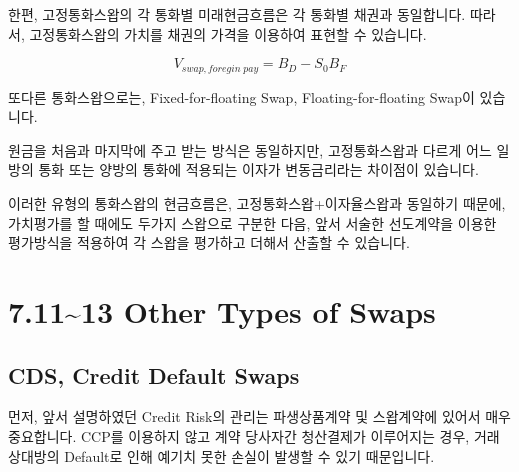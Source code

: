 \documentclass[
  letterpaper,
  DIV=11,
  numbers=noendperiod]{scrreprt}
\begin{document}
한편, 고정통화스왑의 각 통화별 미래현금흐름은 각 통화별 채권과
동일합니다. 따라서, 고정통화스왑의 가치를 채권의 가격을 이용하여 표현할
수 있습니다.

\[V_{swap,foregin\;pay}=B_D-S_0B_F\]

\begin{tcolorbox}[enhanced jigsaw, titlerule=0mm, bottomtitle=1mm, left=2mm, title=\textcolor{quarto-callout-note-color}{\faInfo}\hspace{0.5em}{Another Currency Swaps}, toptitle=1mm, bottomrule=.15mm, colframe=quarto-callout-note-color-frame, breakable, opacityback=0, rightrule=.15mm, opacitybacktitle=0.6, coltitle=black, colback=white, arc=.35mm, colbacktitle=quarto-callout-note-color!10!white, toprule=.15mm, leftrule=.75mm]

또다른 통화스왑으로는, Fixed-for-floating Swap, Floating-for-floating
Swap이 있습니다.

원금을 처음과 마지막에 주고 받는 방식은 동일하지만, 고정통화스왑과
다르게 어느 일방의 통화 또는 양방의 통화에 적용되는 이자가 변동금리라는
차이점이 있습니다.

이러한 유형의 통화스왑의 현금흐름은, 고정통화스왑+이자율스왑과 동일하기
때문에, 가치평가를 할 때에도 두가지 스왑으로 구분한 다음, 앞서 서술한
선도계약을 이용한 평가방식을 적용하여 각 스왑을 평가하고 더해서 산출할
수 있습니다.

\end{tcolorbox}

\section*{7.11\textasciitilde13 Other Types of
Swaps}\label{other-types-of-swaps}


\subsection*{CDS, Credit Default Swaps}\label{cds-credit-default-swaps}

먼저, 앞서 설명하였던 Credit Risk의 관리는 파생상품계약 및 스왑계약에
있어서 매우 중요합니다. CCP를 이용하지 않고 계약 당사자간 청산결제가
이루어지는 경우, 거래상대방의 Default로 인해 예기치 못한 손실이 발생할
수 있기 때문입니다.
\end{document}
